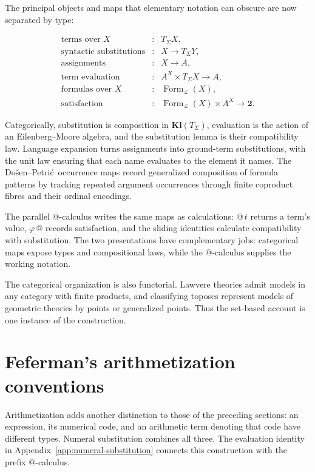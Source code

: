 \documentclass[11pt]{article}
\makeatletter
\newcommand{\atsign}{\mathord{@}}
\newcommand{\DP}{Do\v{s}en--Petri\'{c}}
\theoremstyle{definition}
\makeatother
\begin{document}
The principal objects and maps that elementary notation can obscure are now
separated by type:

\[
\begin{array}{rcl}
\text{terms over }X &:& T_\Sigma X,\\
\text{syntactic substitutions} &:& X\to T_\Sigma Y,\\
\text{assignments} &:& X\to A,\\
\text{term evaluation} &:& A^X\times T_\Sigma X\to A,\\
\text{formulas over }X &:& \operatorname{Form}_{\mathcal L}(X),\\
\text{satisfaction} &:&
\operatorname{Form}_{\mathcal L}(X)\times A^X\to\mathbf2.
\end{array}
\]

Categorically, substitution is composition in \(\mathbf{Kl}(T_\Sigma)\),
evaluation is the action of an Eilenberg--Moore algebra, and the substitution
lemma is their compatibility law. Language expansion turns assignments into
ground-term substitutions, with the unit law ensuring that each name evaluates
to the element it names. The \DP\ occurrence maps record generalized
composition of formula patterns by tracking repeated argument occurrences
through finite coproduct fibres and their ordinal encodings.

The parallel $\atsign$-calculus writes the same maps as calculations:
$\atsign\,t$ returns a term's value, \(\varphi\,\atsign\) records satisfaction,
and the sliding identities calculate compatibility with substitution. The two
presentations have complementary jobs: categorical maps expose types and compositional
laws, while the $\atsign$-calculus supplies the working notation.

The categorical organization is also functorial. Lawvere theories admit models
in any category with finite products, and classifying toposes represent models
of geometric theories by points or generalized points. Thus the set-based
account is one instance of the construction.

\clearpage
\appendix
{}
\section{Feferman's arithmetization conventions}\label{app:feferman}

Arithmetization adds another distinction to those of the preceding sections:
an expression, its numerical code, and an arithmetic term denoting that code
have different types. Numeral substitution combines all three. The
evaluation identity in Appendix~\ref{app:numeral-substitution} connects this
construction with the prefix $\atsign$-calculus.
\end{document}
